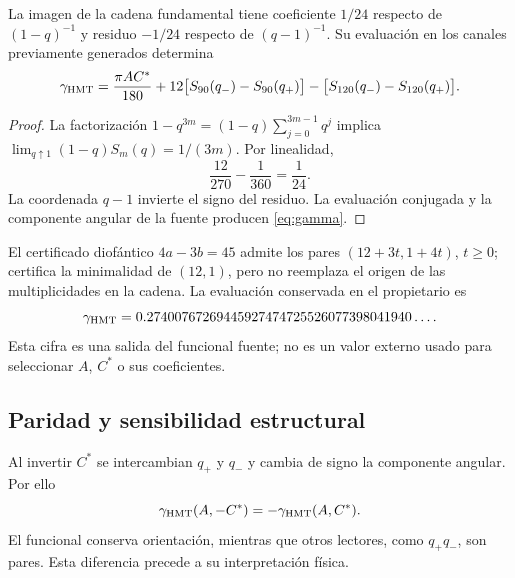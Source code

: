 \begin{theorem}
La imagen de la cadena fundamental tiene coeficiente $1/24$
respecto de $(1-q)^{-1}$ y residuo $-1/24$ respecto de $(q-1)^{-1}$.
Su evaluación en los canales previamente generados determina
\begin{equation}
\gamma_{\mathrm{HMT}}=
\frac{\pi AC^*}{180}
+12\bigl[S_{90}(q_-)-S_{90}(q_+)\bigr]
-\bigl[S_{120}(q_-)-S_{120}(q_+)\bigr].
\label{eq:gamma}
\end{equation}
\end{theorem}
\begin{proof}
La factorización $1-q^{3m}=(1-q)\sum_{j=0}^{3m-1}q^j$ implica
$\lim_{q\uparrow1}(1-q)S_m(q)=1/(3m)$. Por linealidad,
\[
\frac{12}{270}-\frac1{360}=\frac1{24}.
\]
La coordenada $q-1$ invierte el signo del residuo.
La evaluación conjugada y la componente angular de la fuente
producen \eqref{eq:gamma}.
\end{proof}

El certificado diofántico $4a-3b=45$ admite los pares
$(12+3t,1+4t)$, $t\ge0$; certifica la minimalidad de $(12,1)$,
pero no reemplaza el origen de las multiplicidades en la cadena.
La evaluación conservada en el propietario es
\[
\gamma_{\mathrm{HMT}}
=0.27400767269445927474725526077398041940\ldots.
\]
Esta cifra es una salida del funcional fuente; no es un valor externo
usado para seleccionar $A$, $C^*$ o sus coeficientes.

\subsection{Paridad y sensibilidad estructural}
Al invertir $C^*$ se intercambian $q_+$ y $q_-$ y cambia de signo
la componente angular. Por ello
\[
\gamma_{\mathrm{HMT}}(A,-C^*)=-\gamma_{\mathrm{HMT}}(A,C^*).
\]
El funcional conserva orientación, mientras que otros lectores,
como $q_+q_-$, son pares. Esta diferencia precede a su interpretación física.
